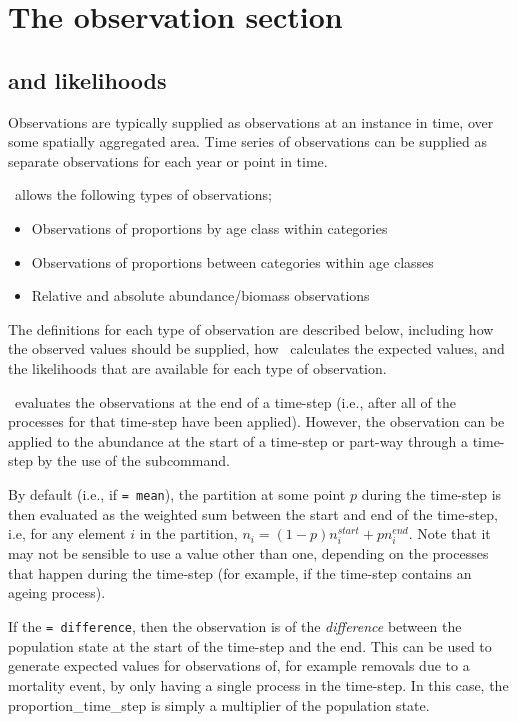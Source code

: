 \section{The observation section\label{sec:observation-section}}

\subsection{ and likelihoods\label{sec:likelihoods}}

Observations are typically supplied as observations at an instance in time, over some spatially aggregated area. Time series of observations can be supplied as separate observations for each year or point in time. 

\SPM\ allows the following types of observations;
\begin{itemize}
  \item Observations of proportions by age class within categories
  \item Observations of proportions between categories within age classes
  \item Relative and absolute abundance/biomass observations
\end{itemize}

The definitions for each type of observation are described below, including how the observed values should be supplied, how \SPM\ calculates the expected values, and the likelihoods that are available for each type of observation.

\SPM\ evaluates the observations at the end of a time-step (i.e., after all of the processes for that time-step have been applied). However, the observation can be applied to the abundance at the start of a time-step or part-way through a time-step by the use of the  subcommand. 

By default (i.e., if  \texttt{= mean}), the partition at some point $p$ during the time-step is then evaluated as the weighted sum between the start and end of the time-step, i.e, for any element $i$ in the partition, $n_i=(1-p) n_i^{start} + p n_i^{end}$. Note that it may not be sensible to use a value other than one, depending on the processes that happen during the time-step (for example, if the time-step contains an ageing process).

If the  \texttt{= difference}, then the observation is of the \emph{difference} between the population state at the start of the time-step and the end. This can be used to generate expected values for observations of, for example removals due to a mortality event, by only having a single process in the time-step. In this case, the proportion\_time\_step is simply a multiplier of the population state.

